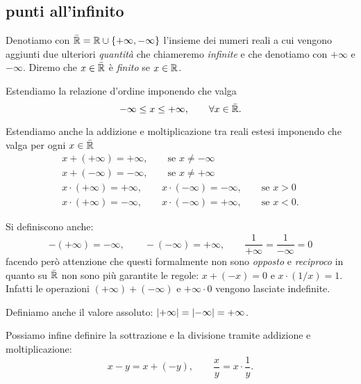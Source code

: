 \subsection{punti all'infinito}
\label{sec:reali_estesi}

\begin{definition}
\mymargin{$\bar\RR$}%
\index{$\bar{\RR}$}
Denotiamo con $\bar {{\mathbb R}}={\mathbb R} \cup {\left\{ +\infty, -\infty \right\}}$ l'insieme dei numeri reali
\mymargin{$+\infty$, $-\infty$}%
\index{$+\infty$, $-\infty$}
a cui vengono aggiunti due ulteriori \emph{quantità} che chiameremo
\emph{infinite} e che denotiamo con $+\infty$ e $-\infty$.
Diremo che $x\in \bar {{\mathbb R}}$ è \emph{finito} se $x\in {\mathbb R}$.
\end{definition}


Estendiamo la relazione d'ordine imponendo che valga
\[
  -\infty \le x \le +\infty, \qquad \forall x \in \bar{{\mathbb R}}.
\]

Estendiamo anche la addizione e moltiplicazione
tra reali estesi imponendo che valga per ogni $x\in \bar {{\mathbb R}}$
\begin{gather*}
  x + (+\infty) = +\infty, \qquad \text{se $x\neq -\infty$}\\
  x + (-\infty) = -\infty, \qquad \text{se $x\neq +\infty$}\\
  x \cdot (+\infty) = +\infty, \qquad
  x \cdot (-\infty) = -\infty, \qquad \text{se $x>0$} \\
  x \cdot (+\infty) = -\infty, \qquad
  x \cdot (-\infty) = +\infty, \qquad \text{se $x<0$}.
\end{gather*}

Si definiscono anche:
\[
 -(+\infty) = -\infty, \qquad
 -(-\infty) = +\infty, \qquad
 \frac{1}{+\infty} = \frac{1}{-\infty}=0
\]
facendo però attenzione che
questi formalmente non sono \emph{opposto}
e \emph{reciproco} in quanto
su $\bar \RR$ non sono più garantite
le regole: $x + (-x) = 0$ e $x \cdot (1/x) = 1$.
Infatti
le operazioni $(+\infty) + (-\infty)$ e $+\infty \cdot 0$ vengono
lasciate indefinite.

Definiamo anche il valore assoluto: ${\left|+\infty\right|} = {\left|-\infty\right|} = +\infty$.

Possiamo infine definire la sottrazione e la divisione tramite
addizione e moltiplicazione:
\[
  x - y = x + (-y), \qquad \frac{x}{y} = x \cdot \frac{1}{y}.
\]

